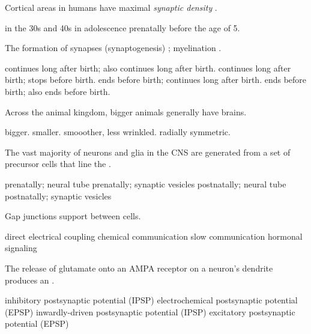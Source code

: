\documentclass[answers]{exam}
\begin{document}
\begin{questions}
\question Cortical areas in humans have maximal \emph{synaptic density} \fillin.
\begin{choices}
\choice in the 30s and 40s
\choice in adolescence
\choice prenatally
\correctchoice before the age of 5.
\end{choices}

\question The formation of synapses (synaptogenesis) \fillin; myelination \fillin.
\begin{choices}
\correctchoice continues long after birth; also continues long after birth.
\choice continues long after birth; stops before birth.
\choice ends before birth; continues long after birth.
\choice ends before birth; also ends before birth.
\end{choices}

\question Across the animal kingdom, bigger animals generally have \fillin brains.
\begin{choices}
\correctchoice bigger.
\choice smaller.
\choice smooother, less wrinkled.
\choice radially symmetric.
\end{choices}

\question The vast majority of neurons and glia in the CNS are generated \fillin from a set of precursor cells that line the \fillin.
\begin{choices}
\correctchoice prenatally; neural tube
\choice prenatally; synaptic vesicles
\choice postnatally; neural tube
\choice postnatally; synaptic vesicles
\end{choices}


\question Gap junctions support \fillin between cells.
\begin{choices}
\correctchoice direct electrical coupling
\choice chemical communication
\choice slow communication
\choice hormonal signaling
\end{choices}

\question The release of glutamate onto an AMPA receptor on a neuron's dendrite produces an \fillin.
\begin{choices}
\choice inhibitory postsynaptic potential (IPSP)
\choice electrochemical postsynaptic potential (EPSP)
\choice inwardly-driven postsynaptic potential (IPSP)
\correctchoice excitatory postsynaptic potential (EPSP)
\end{choices}


\end{questions}
\end{document}
